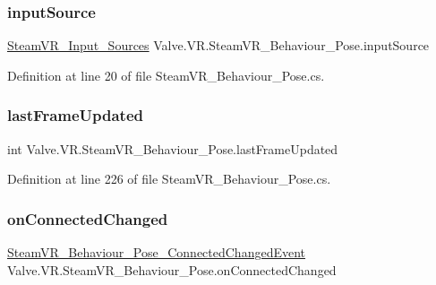 \subsubsection{\texorpdfstring{inputSource}{inputSource}}
{\footnotesize\ttfamily \mbox{\hyperlink{namespace_valve_1_1_v_r_a82e5bf501cc3aa155444ee3f0662853f}{Steam\+V\+R\+\_\+\+Input\+\_\+\+Sources}} Valve.\+V\+R.\+Steam\+V\+R\+\_\+\+Behaviour\+\_\+\+Pose.\+input\+Source}



Definition at line 20 of file Steam\+V\+R\+\_\+\+Behaviour\+\_\+\+Pose.\+cs.

\mbox{\label{class_valve_1_1_v_r_1_1_steam_v_r___behaviour___pose_a8eda899639df2ab346fbc027c7e6e8da}} 
\subsubsection{\texorpdfstring{lastFrameUpdated}{lastFrameUpdated}}
{\footnotesize\ttfamily int Valve.\+V\+R.\+Steam\+V\+R\+\_\+\+Behaviour\+\_\+\+Pose.\+last\+Frame\+Updated\hspace{0.3cm}{\ttfamily [protected]}}



Definition at line 226 of file Steam\+V\+R\+\_\+\+Behaviour\+\_\+\+Pose.\+cs.

\mbox{\label{class_valve_1_1_v_r_1_1_steam_v_r___behaviour___pose_a5cb65c8eacdd57472f5c6e3d11302391}} 
\subsubsection{\texorpdfstring{onConnectedChanged}{onConnectedChanged}}
{\footnotesize\ttfamily \mbox{\hyperlink{class_valve_1_1_v_r_1_1_steam_v_r___behaviour___pose___connected_changed_event}{Steam\+V\+R\+\_\+\+Behaviour\+\_\+\+Pose\+\_\+\+Connected\+Changed\+Event}} Valve.\+V\+R.\+Steam\+V\+R\+\_\+\+Behaviour\+\_\+\+Pose.\+on\+Connected\+Changed}



